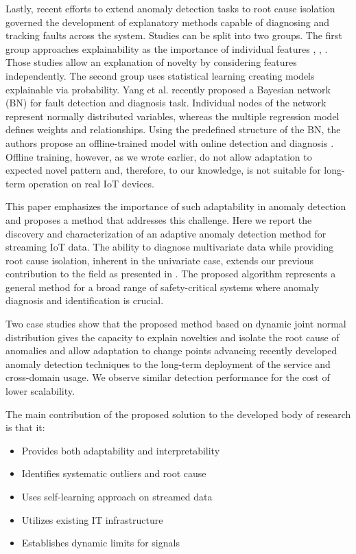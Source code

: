 Lastly, recent efforts to extend anomaly detection tasks to root cause isolation governed the development of explanatory methods capable of diagnosing and tracking faults across the system. Studies can be split into two groups. The first group approaches explainability as the importance of individual features \cite{Carletti2019}, \cite{Nguyen2019}, \cite{Amarasinghe2018}. Those studies allow an explanation of novelty by considering features independently. The second group uses statistical learning creating models explainable via probability. Yang et al. recently proposed a Bayesian network (BN) for fault detection and diagnosis task. Individual nodes of the network represent normally distributed variables, whereas the multiple regression model defines weights and relationships. Using the predefined structure of the BN, the authors propose an offline-trained model with online detection and diagnosis \cite{Yang2022}. Offline training, however, as we wrote earlier, do not allow adaptation to expected novel pattern and, therefore, to our knowledge, is not suitable for long-term operation on real IoT devices.

This paper emphasizes the importance of such adaptability in anomaly detection and proposes a method that addresses this challenge. Here we report the discovery and characterization of an adaptive anomaly detection method for streaming IoT data. The ability to diagnose multivariate data while providing root cause isolation, inherent in the univariate case, extends our previous contribution to the field as presented in \cite{Wadinger2023}. The proposed algorithm represents a general method for a broad range of safety-critical systems where anomaly diagnosis and identification is crucial.

Two case studies show that the proposed method based on dynamic joint normal distribution gives the capacity to explain novelties and isolate the root cause of anomalies and allow adaptation to change points advancing recently developed anomaly detection techniques to the long-term deployment of the service and cross-domain usage. We observe similar detection performance for the cost of lower scalability.

The main contribution of the proposed solution to the developed body of research is that it:
\begin{itemize}
\item Provides both adaptability and interpretability
\item Identifies systematic outliers and root cause
\item Uses self-learning approach on streamed data
\item Utilizes existing IT infrastructure
\item Establishes dynamic limits for signals
\end{itemize}